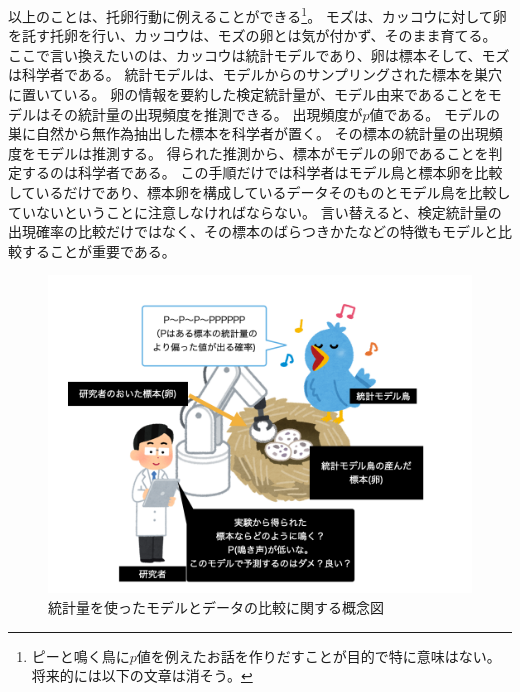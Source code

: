 
以上のことは、托卵行動に例えることができる\footnote{ピーと鳴く鳥に$p$値を例えたお話を作りだすことが目的で特に意味はない。将来的には以下の文章は消そう。}。
モズは、カッコウに対して卵を託す托卵を行い、カッコウは、モズの卵とは気が付かず、そのまま育てる。
ここで言い換えたいのは、カッコウは統計モデルであり、卵は標本そして、モズは科学者である。
統計モデルは、モデルからのサンプリングされた標本を巣穴に置いている。
卵の情報を要約した検定統計量が、モデル由来であることをモデルはその統計量の出現頻度を推測できる。
出現頻度が$p$値である。
モデルの巣に自然から無作為抽出した標本を科学者が置く。
その標本の統計量の出現頻度をモデルは推測する。
得られた推測から、標本がモデルの卵であることを判定するのは科学者である。
この手順だけでは科学者はモデル鳥と標本卵を比較しているだけであり、標本卵を構成しているデータそのものとモデル鳥を比較していないということに注意しなければならない。
言い替えると、検定統計量の出現確率の比較だけではなく、その標本のばらつきかたなどの特徴もモデルと比較することが重要である。

\begin{figure}
    \begin{center}
        \includegraphics[bb=0 0 1024 768,width=15cm]{./image/01_/conceptual_diagram/conceptual_diagram.003.png}
        \caption{統計量を使ったモデルとデータの比較に関する概念図}
        \label{fig:conceptual_diagram_test}
    \end{center}
\end{figure}


